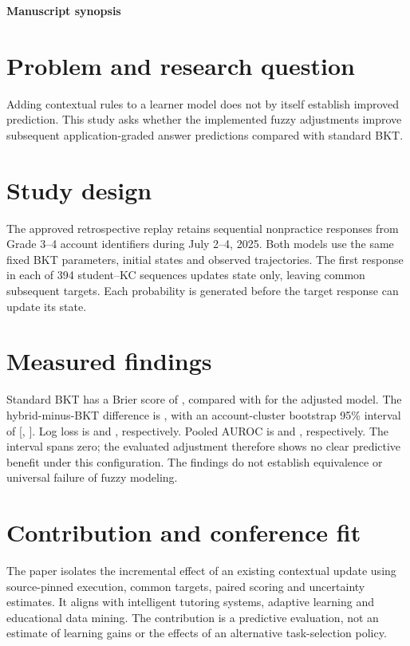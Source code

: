 \documentclass[11pt]{article}
\begin{document}
\begin{center}
{\Large\bfseries Manuscript synopsis\par}
\medskip
\AAIEPaperTitle
\end{center}
\AAIEDraftNotice
\section*{Problem and research question}
Adding contextual rules to a learner model does not by itself establish improved
prediction. This study asks whether the implemented fuzzy adjustments improve
subsequent application-graded answer predictions compared with standard BKT.
\section*{Study design}
The approved retrospective replay retains \CandidateResponseCount{} sequential
nonpractice responses from \CandidateAccountCount{} Grade 3--4 account identifiers
during July 2--4, 2025. Both models use the same fixed BKT parameters, initial
states and observed trajectories. The first response in each of 394 student--KC
sequences updates state only, leaving \ScoredTargets{} common subsequent targets.
Each probability is generated before the target response can update its state.
\section*{Measured findings}
Standard BKT has a Brier score of \BktBrier{}, compared with \HybridBrier{} for
the adjusted model. The hybrid-minus-BKT difference is \BrierDelta{}, with an
account-cluster bootstrap 95\% interval of [\BrierCILower{}, \BrierCIUpper{}].
Log loss is \BktLogLoss{} and \HybridLogLoss{}, respectively. Pooled AUROC is
\BktAUC{} and \HybridAUC{}, respectively. The interval spans zero; the evaluated
adjustment therefore shows no clear predictive benefit under this configuration.
The findings do not establish equivalence or universal failure of fuzzy modeling.
\section*{Contribution and conference fit}
The paper isolates the incremental effect of an existing contextual update using
source-pinned execution, common targets, paired scoring and uncertainty estimates.
It aligns with intelligent tutoring systems, adaptive learning and educational
data mining. The contribution is a predictive evaluation, not an estimate of
learning gains or the effects of an alternative task-selection policy.
\end{document}
